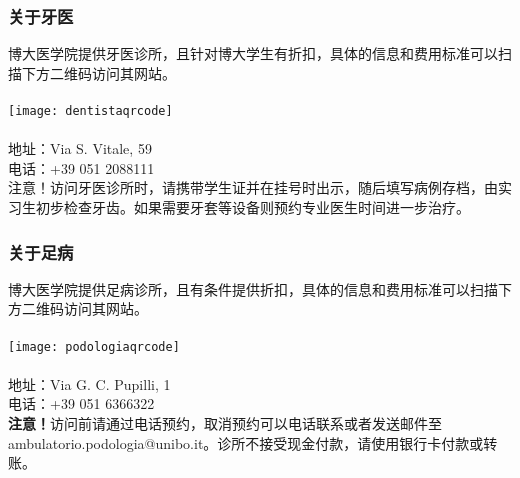 \subsubsection{关于牙医}
博大医学院提供牙医诊所，且针对博大学生有折扣，具体的信息和费用标准可以扫描下方二维码访问其网站。\\
\\
\texttt{[image: dentistaqrcode]}\\
\\
地址：Via S. Vitale, 59\\
电话：+39 051 2088111\\
注意！访问牙医诊所时，请携带学生证并在挂号时出示，随后填写病例存档，由实习生初步检查牙齿。如果需要牙套等设备则预约专业医生时间进一步治疗。

\subsubsection{关于足病}
博大医学院提供足病诊所，且有条件提供折扣，具体的信息和费用标准可以扫描下方二维码访问其网站。\\
\\
\texttt{[image: podologiaqrcode]}\\
\\
地址：Via G. C. Pupilli, 1\\
电话：+39 051 6366322\\
\textbf{注意！}访问前请通过电话预约，取消预约可以电话联系或者发送邮件至ambulatorio.podologia@unibo.it。诊所不接受现金付款，请使用银行卡付款或转账。

